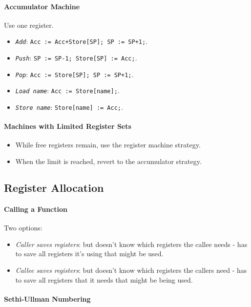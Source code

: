 \documentclass[twocolumn,english]{article}
\begin{document}
\paragraph{Accumulator Machine}

Use one register.
\begin{itemize}
\item \texttt{\emph{Add}}: \texttt{Acc := Acc+Store{[}SP{]}; SP := SP+1;}.
\item \texttt{\emph{Push}}: \texttt{SP := SP-1; Store{[}SP{]} := Acc;}.
\item \texttt{\emph{Pop}}: \texttt{Acc := Store{[}SP{]}; SP := SP+1;}.
\item \texttt{\emph{Load name}}: \texttt{Acc := Store{[}name{]};}.
\item \texttt{\emph{Store name}}: \texttt{Store{[}name{]} := Acc;}.
\end{itemize}

\paragraph{Machines with Limited Register Sets}
\begin{itemize}
\item While free registers remain, use the register machine strategy.
\item When the limit is reached, revert to the accumulator strategy.
\end{itemize}

\subsection{Register Allocation}

\paragraph{Calling a Function}

Two options:
\begin{itemize}
\item \emph{Caller saves registers}: but doesn't know which registers the
callee needs - has to save all registers it's using that might be
used.
\item \emph{Callee saves registers}: but doesn't know which registers the
callers need - has to save all registers that it needs that might
be being used.
\end{itemize}

\paragraph{Sethi-Ullman Numbering}
\end{document}
